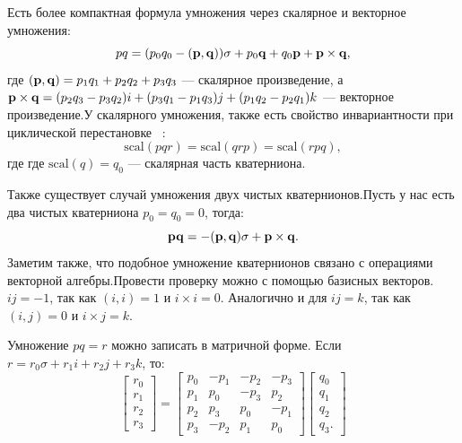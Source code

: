 Есть более компактная формула умножения через скалярное и векторное умножения:
\begin{equation*}
    pq = (p_0 q_0 - (\vb{p}, \vb{q}))\sigma + p_0 \vb{q} + q_0 \vb{p} + \vb{p} \times \vb{q},
\end{equation*}
где $(\vb{p}, \vb{q}) = p_1 q_1 + p_2 q_2 + p_3 q_3$ --- скалярное произведение, а $\vb{p} \times \vb{q} = (p_2 q_3 - p_3 q_2)i + (p_3 q_1 - p_1 q_3)j + (p_1 q_2 - p_2 q_1)k$ --- векторное произведение.У скалярного умножения, также есть свойство инвариантности при циклической перестановке ~\cite{Branets:1973}:
\begin{equation*}
    \text{scal}(pqr) = \text{scal}(qrp) = \text{scal}(rpq),
\end{equation*}
где где $\text{scal}(q) = q_0$ --- скалярная часть кватерниона.

Также существует случай умножения двух чистых кватернионов.Пусть у нас есть два чистых кватерниона $p_0 = q_0 = 0$, тогда:
\begin{equation*}
    \vb{p} \vb{q} = -(\vb{p}, \vb{q})\sigma + \vb{p} \times \vb{q}.
\end{equation*}
Заметим также, что подобное умножение кватернионов связано с операциями векторной алгебры.Провести проверку можно с помощью базисных векторов. $ij = -1$, так как $(i,i)=1$ и $i \times i = 0$. Аналогично и для $i j = k$, так как $(i,j)=0$ и $i \times j = k$.

Умножение $pq = r$ можно записать в матричной форме. Если $r = r_0\sigma + r_1 i + r_2 j + r_3 k$, то:
\begin{equation*}
    \begin{bmatrix}
        r_0 \\ r_1 \\ r_2 \\ r_3
        \end{bmatrix}
        =
        \begin{bmatrix}
        p_0 & -p_1 & -p_2 & -p_3 \\
        p_1 &  p_0 & -p_3 &  p_2 \\
        p_2 &  p_3 &  p_0 & -p_1 \\
        p_3 & -p_2 &  p_1 &  p_0
        \end{bmatrix}
        \begin{bmatrix}
        q_0 \\ q_1 \\ q_2 \\ q_3.
        \end{bmatrix}
\end{equation*}

